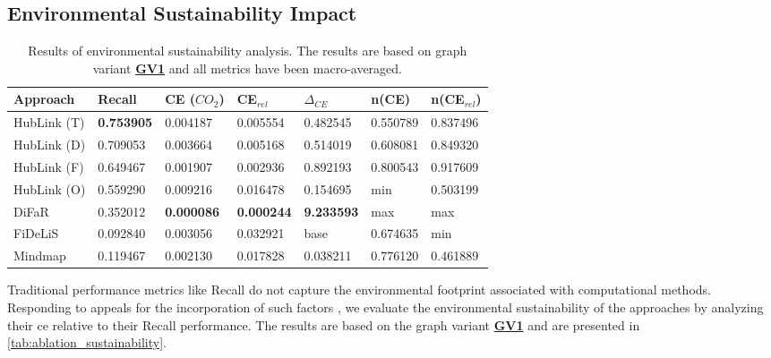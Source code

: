 \subsection{Environmental Sustainability Impact}
\label{sec:evaluating_sustainability}

\begin{table}[t]
\centering
\begin{tabular}{@{}lllllll@{}}
\toprule
Approach & Recall & CE ($CO_2$) & CE$_{rel}$ & $\Delta_{CE}$ & n(CE) & n(CE$_{rel}$) \\
\midrule 
HubLink (T) & \textbf{0.753905} & 0.004187 & 0.005554 & 0.482545 & 0.550789 & 0.837496 \\
HubLink (D) & 0.709053 & 0.003664 & 0.005168 & 0.514019 & 0.608081 & 0.849320 \\
HubLink (F) & 0.649467 & 0.001907 & 0.002936 & 0.892193 & 0.800543 & 0.917609 \\
HubLink (O) & 0.559290 & 0.009216 & 0.016478 & 0.154695 & min & 0.503199 \\
DiFaR & 0.352012 & \textbf{0.000086} & \textbf{0.000244} & \textbf{9.233593} & max & max \\
FiDeLiS & 0.092840 & 0.003056 & 0.032921 & base & 0.674635 & min \\
Mindmap & 0.119467 & 0.002130 & 0.017828 & 0.038211 & 0.776120 & 0.461889 \\
\bottomrule 
\end{tabular}%
\caption[Results on Environmental Sustainability]{Results of environmental sustainability analysis. The results are based on graph variant \hyperref[enum:gv1]{\textbf{GV1}} and all metrics have been macro-averaged.}
\label{tab:ablation_sustainability}
\end{table}

Traditional performance metrics like Recall do not capture the environmental footprint associated with computational methods. Responding to appeals for the incorporation of such factors \cite{kaplan_responsible_2025}, we evaluate the environmental sustainability of the approaches by analyzing their \acrfull{ce} relative to their Recall performance. The results are based on the graph variant \hyperref[enum:gv1]{\textbf{GV1}} and are presented in \autoref{tab:ablation_sustainability}.

